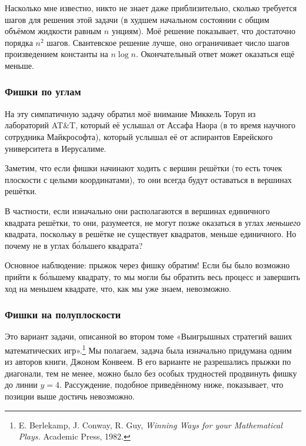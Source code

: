 Насколько мне известно, никто не знает даже приблизительно, сколько требуется шагов для решения этой задачи (в худшем начальном состоянии с общим объёмом жидкости равным $n$ унциям).
Моё решение показывает, что достаточно порядка $n^2$ шагов.
Свантевское  решение лучше, оно ограничивает число шагов произведением константы на $n\log n$.
Окончательный ответ может оказаться ещё меньше.

\subsubsection*{Фишки по углам}%

На эту симпатичную задачу обратил моё внимание Миккель Торуп из лабораторий AT\&T, %
который её услышал от Ассафа Наора %
(в то время научного сотрудника Майкрософта), который услышал её от аспирантов Еврейского университета в Иерусалиме.

\medskip

Заметим, что если фишки начинают ходить с вершин решётки (то есть точек плоскости с целыми координатами), то они всегда будут оставаться в вершинах решётки.

В частности, если изначально они располагаются в вершинах единичного квадрата решётки, то они, разумеется, не могут позже оказаться в углах \emph{меньшего} квадрата, поскольку в решётке не существует квадратов, меньше единичного.
Но почему не в углах б\'{о}льшего квадрата?

Основное наблюдение: прыжок через фишку обратим!
Если бы было возможно прийти к б\'{о}льшему квадрату, то мы могли бы обратить весь процесс и завершить ход на меньшем квадрате, что, как мы уже знаем, невозможно.
\heart

\subsubsection*{Фишки на полуплоскости}%

Это вариант задачи, описанной во втором томе «Выигрышных стратегий ваших математических игр».\footnote{E. Berlekamp, J. Conway, R. Guy,
\emph{Winning Ways for your Mathematical Plays.} Academic Press, 1982.}
Мы полагаем, задача была изначально придумана одним из авторов книги, Джоном Конвеем.
В его варианте не разрешались прыжки по диагонали, тем не менее, можно было без особых трудностей продвинуть фишку до линии $y = 4$.
Рассуждение, подобное приведённому ниже, показывает, что позиции выше достичь невозможно.

